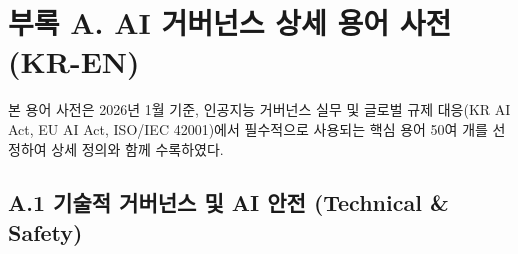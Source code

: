\chapter*{부록 A. AI 거버넌스 상세 용어 사전 (KR-EN)}
\label{ch:appendix_a}

본 용어 사전은 2026년 1월 기준, 인공지능 거버넌스 실무 및 글로벌 규제 대응(KR AI Act, EU AI Act, ISO/IEC 42001)에서 필수적으로 사용되는 핵심 용어 50여 개를 선정하여 상세 정의와 함께 수록하였다.

\section*{A.1 기술적 거버넌스 및 AI 안전 (Technical \& Safety)}

